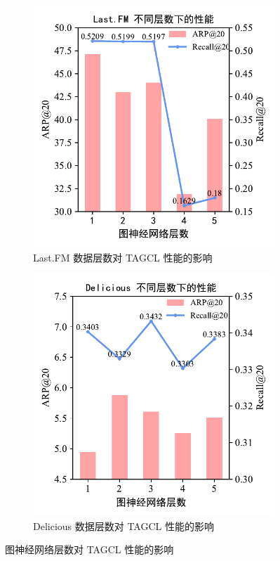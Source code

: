 \begin{figure}[!h]
  \centering
  \begin{subfigure}{0.49\linewidth}
      \centering
      \includegraphics[width=.88\linewidth]{figure/tagcl_param_lastfm_layer.pdf}
      \caption{Last.FM 数据层数对 TAGCL 性能的影响}
      \label{fig:tagcl_param_lastfm_layer}
  \end{subfigure}
  \begin{subfigure}{0.49\linewidth}
    \centering
    \includegraphics[width=.88\linewidth]{figure/tagcl_param_de_layer.pdf}
    \caption{Delicious 数据层数对 TAGCL 性能的影响}
    \label{fig:tagcl_param_de_layer}
\end{subfigure}
  \caption{图神经网络层数对 TAGCL 性能的影响}
  \label{fig:tagcl_param_layer}
\end{figure}

